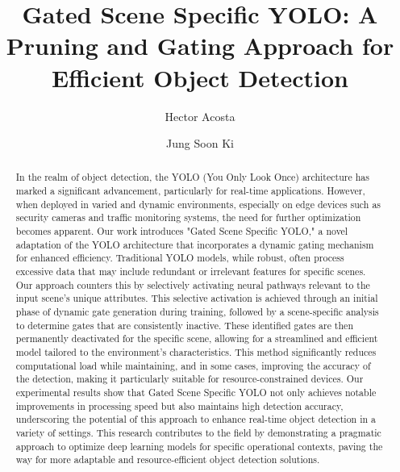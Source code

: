 \documentclass[runningheads]{llncs}
\begin{document}
%
\title{Gated Scene Specific YOLO: A Pruning and Gating Approach for Efficient Object Detection}
%
%
\author{Hector Acosta \and
Jung Soon Ki}
%
%
%
\maketitle              %
%
\begin{abstract}
In the realm of object detection, the YOLO (You Only Look Once) architecture has marked a significant advancement, particularly for real-time applications. However, when deployed in varied and dynamic environments, especially on edge devices such as security cameras and traffic monitoring systems, the need for further optimization becomes apparent. Our work introduces "Gated Scene Specific YOLO," a novel adaptation of the YOLO architecture that incorporates a dynamic gating mechanism for enhanced efficiency. Traditional YOLO models, while robust, often process excessive data that may include redundant or irrelevant features for specific scenes. Our approach counters this by selectively activating neural pathways relevant to the input scene's unique attributes. This selective activation is achieved through an initial phase of dynamic gate generation during training, followed by a scene-specific analysis to determine gates that are consistently inactive. These identified gates are then permanently deactivated for the specific scene, allowing for a streamlined and efficient model tailored to the environment's characteristics. This method significantly reduces computational load while maintaining, and in some cases, improving the accuracy of the detection, making it particularly suitable for resource-constrained devices. Our experimental results show that Gated Scene Specific YOLO not only achieves notable improvements in processing speed but also maintains high detection accuracy, underscoring the potential of this approach to enhance real-time object detection in a variety of settings. This research contributes to the field by demonstrating a pragmatic approach to optimize deep learning models for specific operational contexts, paving the way for more adaptable and resource-efficient object detection solutions.

\end{abstract}
%
%
%
\end{document}

